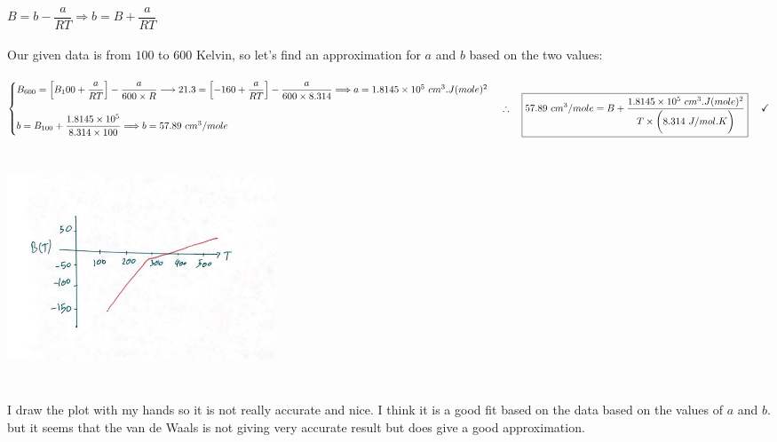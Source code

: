 \documentclass[fleqn]{article}
\begin{document}
\begin{enumerate}
\begin{enumerate}
        \textcolor{hwColor}{
          \\
          $
            B=b-\dfrac{a}{RT} \Longrightarrow b=B+\dfrac{a}{RT}
          $
          \\
          \\
          Our given data is from $100$ to $600$ Kelvin, so let's find an approximation for $a$ and $b$ based on the two values:
          \\
          \\
          $
            \begin{cases}
              B_{600}= \left[B_100+\dfrac{a}{RT}\right]-\dfrac{a}{600 \times R} 
              \longrightarrow 21.3= \left[-160+\dfrac{a}{RT}\right]-\dfrac{a}{600 \times 8.314} \Longrightarrow a=1.8145 \times 10^5 ~ cm^3.J(mole)^2
              \\
              \\
              b=B_{100}+\dfrac{1.8145 \times 10^5}{8.314 \times 100} \Longrightarrow b=57.89 ~ cm^3/mole
            \end{cases}
            \\
            \\
            \\
            \therefore ~~~ \boxed{
              57.89 ~ cm^3/mole=B+\dfrac{1.8145 \times 10^5 ~ cm^3.J(mole)^2}{T \times \bigg( 8.314 ~ J/mol.K \bigg)}
            } ~~~~ \checkmark
          $
        }

        \begin{center}
          \includegraphics[height=7cm, width=8cm]{1.JPG}
        \end{center}

        \textcolor{hwColor}{
          I draw the plot with my hands so it is not really accurate and nice. I think it is a good fit based on the data based on 
          the values of $a$ and $b$. but it seems that the van de Waals is not giving very accurate result but does give a good approximation.
          \\
          \\
        }


\end{enumerate}
\end{enumerate}
\end{document}
